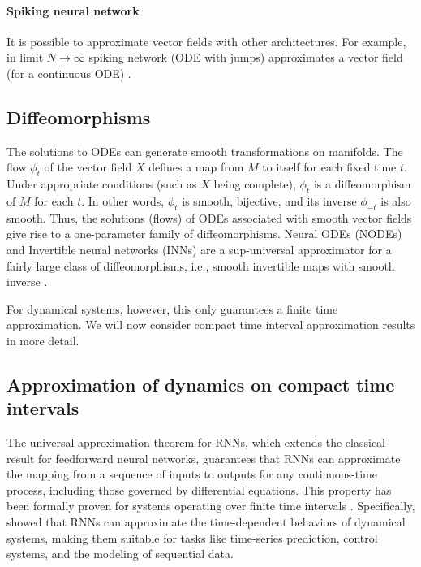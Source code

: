 \documentclass{article}
\theoremstyle{definition}
\theoremstyle{remark}
\newcounter{ct}
\begin{document}
\paragraph{Spiking neural network}
It is possible to approximate vector fields with other architectures.
For example, in limit $N\rightarrow\infty$ spiking network (ODE with jumps) approximates a vector field (for a continuous ODE) \citep{podlaski2024approximating}. 


\subsection{Diffeomorphisms}%
The solutions to ODEs can generate smooth transformations on manifolds.
The flow \( \phi_t \) of the vector field \( X \) defines a map from \( M \) to itself for each fixed time \( t \). Under appropriate conditions (such as \( X \) being complete), \( \phi_t \) is a diffeomorphism of \( M \) for each \( t \). In other words, \( \phi_t \) is smooth, bijective, and its inverse \( \phi_{-t} \) is also smooth.
Thus, the solutions (flows) of ODEs associated with smooth vector fields give rise to a one-parameter family of diffeomorphisms.
%
Neural ODEs (NODEs) and Invertible neural networks (INNs) are a sup-universal approximator for a fairly large class of diffeomorphisms, i.e., smooth invertible maps with smooth inverse \citep{huang2018neural, jaini2019sum, teshima2020uap, teshima2020coupling, ishikawa2023universal}.

For dynamical systems, however, this only guarantees a finite time approximation.
We will now consider compact time interval approximation results in more detail.



\subsection{Approximation of dynamics on compact time intervals}\label{sec:compacttime}
The universal approximation theorem for RNNs, which extends the classical result for feedforward neural networks, guarantees that RNNs can approximate the mapping from a sequence of inputs to outputs for any continuous-time process, including those governed by differential equations.
%
This property has been formally proven for systems operating over finite time intervals \citep{li1992approximation}. %
Specifically, \citet{funahashi1993approximation} showed that RNNs can approximate the time-dependent behaviors of dynamical systems, making them suitable for tasks like time-series prediction, control systems, and the modeling of sequential data.
\end{document}
